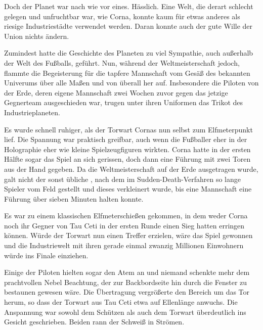 \par

Doch der Planet war nach wie vor eines. Hässlich. Eine Welt, die derart schlecht gelegen und unfruchtbar war, wie Corna, konnte kaum für etwas anderes als riesige Industriestädte verwendet werden. Daran konnte auch der gute Wille der Union nichts ändern.

\par

Zumindest hatte die Geschichte des Planeten zu viel Sympathie, auch außerhalb der Welt des Fußballs, geführt. Nun, während der Weltmeisterschaft jedoch, flammte die Begeisterung für die tapfere Mannschaft vom Gesäß des bekannten Univerums über alle Maßen und von überall her auf. Insbesondere die Piloten von der Erde, deren eigene Mannschaft zwei Wochen zuvor gegen das jetzige Gegnerteam ausgeschieden war, trugen unter ihren Uniformen das Trikot des Industrieplaneten.

\par

Es wurde schnell ruhiger, als der Torwart Cornas nun selbst zum Elfmeterpunkt lief. Die Spannung war praktisch greifbar, auch wenn die Fußballer eher in der Holographie eher wie kleine Spielzeugfiguren wirkten. Corna hatte in der ersten Hälfte sogar das Spiel an sich gerissen, doch dann eine Führung mit zwei Toren aus der Hand gegeben. Da die Weltmeisterschaft auf der Erde ausgetragen wurde, galt nicht der sonst übliche , nach dem im Sudden-Death-Verfahren so lange Spieler vom Feld gestellt und dieses verkleinert wurde, bis eine Mannschaft eine Führung über sieben Minuten halten konnte.

\par

Es war zu einem klassischen Elfmeterschießen gekommen, in dem weder Corna noch ihr Gegner von Tau Ceti in der ersten Runde einen Sieg hatten erringen können. Würde der Torwart nun einen Treffer erzielen, wäre das Spiel gewonnen und die Industriewelt mit ihren gerade einmal zwanzig Millionen Einwohnern würde ins Finale einziehen.

\par

Einige der Piloten hielten sogar den Atem an und niemand schenkte mehr dem prachtvollen Nebel Beachtung, der zur Backbordseite hin durch die Fenster zu bestaunen gewesen wäre. Die Übertragung vergrößerte den Bereich um das Tor herum, so dass der Torwart aus Tau Ceti etwa auf Ellenlänge anwuchs. Die Anspannung war sowohl dem Schützen als auch dem Torwart überdeutlich ins Gesicht geschrieben. Beiden rann der Schweiß in Strömen.

